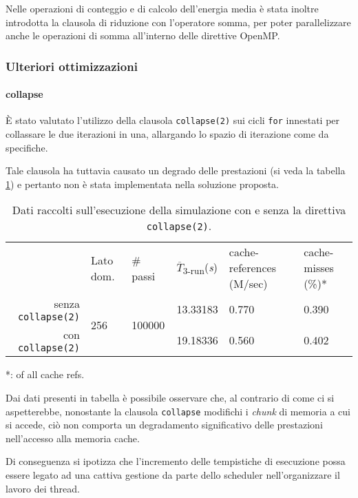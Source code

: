 Nelle operazioni di conteggio e di calcolo dell'energia media è stata inoltre
introdotta la clausola di riduzione con l'operatore somma, per poter
parallelizzare anche le operazioni di somma all'interno delle direttive OpenMP\@.

\subsubsection{Ulteriori ottimizzazioni}

\paragraph{collapse}

È stato valutato l'utilizzo della clausola \texttt{collapse(2)} sui cicli
\texttt{for} innestati per collassare le due iterazioni in una, allargando lo
spazio di iterazione come da specifiche\cite{openmp2018reference}.

Tale clausola ha tuttavia causato un degrado delle prestazioni (si veda la
tabella \ref{tab:collapse}) e pertanto non è stata implementata nella soluzione proposta.

\begin{table}[ht]
\begin{tabularx}{\linewidth}{rXXXXX}
\cmidrule[\heavyrulewidth]{2-6}
& Lato dom. & \# passi & $\overline{T}$\textsubscript{3-run}(\textit{s})
& cache-references (M/sec) & cache-misses (\%)*\\
\cmidrule[\lightrulewidth]{2-6}
senza \texttt{collapse(2)} & \multirow{2}{*}{256} & \multirow{2}{*}{100000} &
   13.33183 & 0.770 & 0.390\\
\cmidrule{4-6}
   con \texttt{collapse(2)} &&& 19.18336 & 0.560 & 0.402\\
\cmidrule[\heavyrulewidth]{2-6}
\end{tabularx}
\caption{\label{tab:collapse}Dati raccolti sull'esecuzione della simulazione con
e senza la direttiva \texttt{collapse(2)}.}
\end{table}

*: of all cache refs.

Dai dati presenti in tabella è possibile osservare che, al contrario di come ci
si aspetterebbe, nonostante la clausola \texttt{collapse} modifichi i
\textit{chunk} di memoria a cui si accede, ciò non comporta un degradamento
significativo delle prestazioni nell'accesso alla memoria cache.

Di conseguenza si ipotizza che l'incremento delle tempistiche di esecuzione
possa essere legato ad una cattiva gestione da parte dello scheduler
nell'organizzare il lavoro dei thread.

